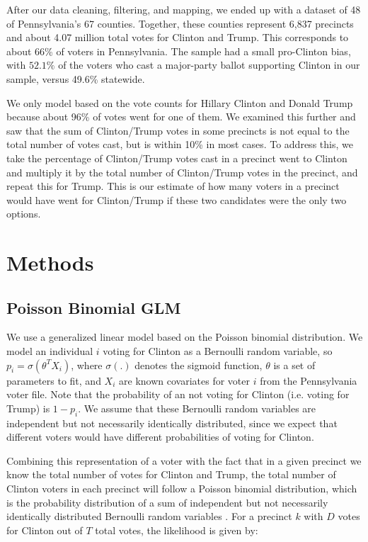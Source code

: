 \documentclass[10pt, letterpaper]{article}
\begin{document}
\begin{multicols}{2}
After our data cleaning, filtering, and mapping, we ended up with a dataset of 48 of Pennsylvania's 67 counties. Together, these counties represent 6,837 precincts and about 4.07 million total votes for Clinton and Trump. This corresponds to about 66\% of voters in Pennsylvania. The sample had a small pro-Clinton bias, with $52.1\%$ of the voters who cast a major-party ballot supporting Clinton in our sample, versus 49.6\% statewide. 

We only model based on the vote counts for Hillary Clinton and Donald Trump because about 96\% of votes went for one of them. We examined this further and saw that the sum of Clinton/Trump votes in some precincts is not equal to the total number of votes cast, but is within 10\% in most cases. To address this, we take the percentage of Clinton/Trump votes cast in a precinct went to Clinton and multiply it by the total number of Clinton/Trump votes in the precinct, and repeat this for Trump. This is our estimate of how many voters in a precinct would have went for Clinton/Trump if these two candidates were the only two options.

\section{Methods}

\subsection{Poisson Binomial GLM}

We use a generalized linear model based on the Poisson binomial distribution. We model an individual $i$ voting for Clinton as a Bernoulli random variable, so $p_i = \sigma(\theta^TX_i)$, where $\sigma(.)$ denotes the sigmoid function, $\theta$ is a set of parameters to fit, and $X_i$ are known covariates for voter $i$ from the Pennsylvania voter file. Note that the probability of an not voting for Clinton (i.e. voting for Trump) is $1 - p_i$. We assume that these Bernoulli random variables are independent but not necessarily identically distributed, since we expect that different voters would have different probabilities of voting for Clinton.

Combining this representation of a voter with the fact that in a given precinct we know the total number of votes for Clinton and Trump, the total number of Clinton voters in each precinct will follow a Poisson binomial distribution, which is the probability distribution of a sum of independent but not necessarily identically distributed Bernoulli random variables \cite{Poibi}. For a precinct $k$ with $D$ votes for Clinton out of $T$ total votes, the likelihood is given by:


\end{multicols}
\end{document}
